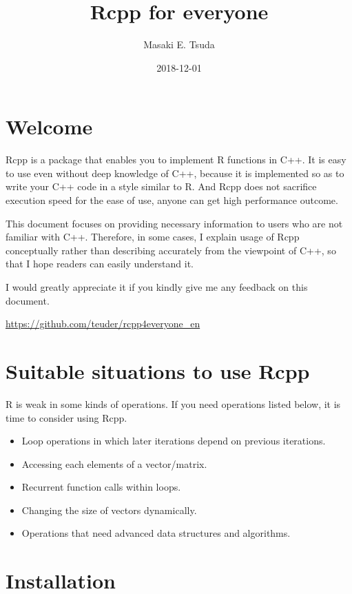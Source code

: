\documentclass[]{book}
\title{Rcpp for everyone}
\author{Masaki E. Tsuda}
\date{2018-12-01}
\providecommand{\tightlist}{%
  \setlength{\itemsep}{0pt}\setlength{\parskip}{0pt}}
\theoremstyle{definition}
\theoremstyle{definition}
\theoremstyle{remark}
\begin{document}
\maketitle

{
\setcounter{tocdepth}{1}
\tableofcontents
}
\chapter*{Welcome}\label{welcome}

Rcpp is a package that enables you to implement R functions in C++. It
is easy to use even without deep knowledge of C++, because it is
implemented so as to write your C++ code in a style similar to R. And
Rcpp does not sacrifice execution speed for the ease of use, anyone can
get high performance outcome.

This document focuses on providing necessary information to users who
are not familiar with C++. Therefore, in some cases, I explain usage of
Rcpp conceptually rather than describing accurately from the viewpoint
of C++, so that I hope readers can easily understand it.

I would greatly appreciate it if you kindly give me any feedback on this
document.

\url{https://github.com/teuder/rcpp4everyone_en}

\chapter{Suitable situations to use
Rcpp}\label{suitable-situations-to-use-rcpp}

R is weak in some kinds of operations. If you need operations listed
below, it is time to consider using Rcpp.

\begin{itemize}
\tightlist
\item
  Loop operations in which later iterations depend on previous
  iterations.
\item
  Accessing each elements of a vector/matrix.
\item
  Recurrent function calls within loops.
\item
  Changing the size of vectors dynamically.
\item
  Operations that need advanced data structures and algorithms.
\end{itemize}

\chapter{Installation}\label{installation}
\end{document}
